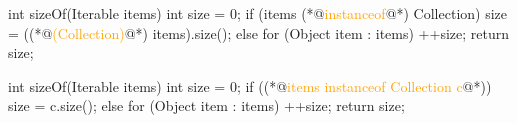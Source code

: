 \documentclass{article}
\begin{document}
\begin{lnSnippet}
int sizeOf(Iterable items) {
  int size = 0;
  if (items (*@\textcolor{orange}{instanceof}@*) Collection) {
    size = ((*@\textcolor{orange}{(Collection)}@*) items).size();
  } else {
    for (Object item : items) {
      ++size;
    }
  }
  return size;
}
\end{lnSnippet}
\begin{lnSnippet}
int sizeOf(Iterable items) {
  int size = 0;
  if ((*@\textcolor{orange}{items instanceof Collection c}@*)) {
    size = c.size();
  } else {
    for (Object item : items) {
      ++size;
    }
  }
  return size;
}
\end{lnSnippet}
\end{document}
